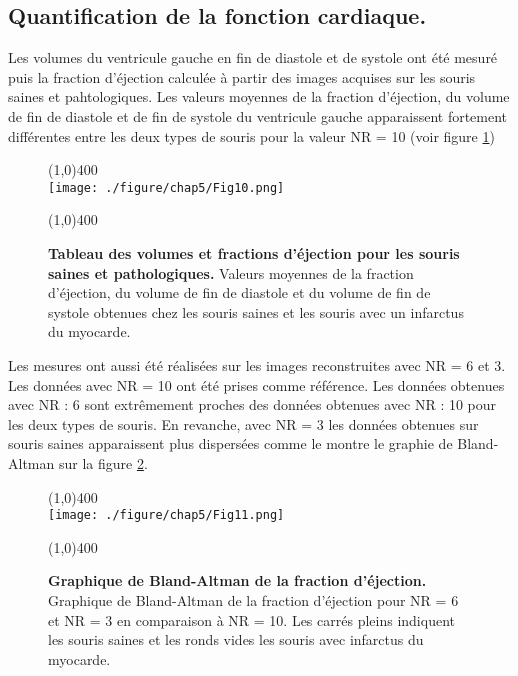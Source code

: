 \subsection{Quantification de la fonction cardiaque.}

Les volumes du ventricule gauche en fin de diastole et de systole ont été mesuré puis la fraction d'éjection calculée à partir des images acquises sur les souris saines et pahtologiques. Les valeurs moyennes de la fraction d'éjection, du volume de fin de diastole et de fin de systole du ventricule gauche apparaissent fortement différentes entre les deux types de souris pour la valeur NR = 10 (voir figure \ref{fig:TabFractionEjection})

\begin{figure}[H]
\centering
\line(1,0){400} \\
\texttt{[image: ./figure/chap5/Fig10.png]}
\caption[Tableau des volumes et fractions d'éjection pour les souris saines et pathologiques.]{\label{fig:TabFractionEjection} \textbf{Tableau des volumes et fractions d'éjection pour les souris saines et pathologiques.} Valeurs moyennes de la fraction d’éjection, du volume de fin de diastole et du volume de fin de systole obtenues chez les souris saines et les souris avec un infarctus du myocarde.}
\line(1,0){400} \\ 
\end{figure}

Les mesures ont aussi été réalisées sur les images reconstruites avec NR = 6 et 3. Les données avec NR = 10 ont été prises comme référence. Les données obtenues avec NR : 6 sont extrêmement proches des données obtenues avec NR : 10 pour les deux types de souris. En revanche, avec NR = 3 les données obtenues sur souris saines apparaissent plus dispersées comme le montre le graphie de Bland-Altman sur la figure \ref{fig:BlandAltmanFractionEjection}.

\begin{figure}[H]
\centering
\line(1,0){400} \\
\texttt{[image: ./figure/chap5/Fig11.png]}
\caption[Graphique de Bland-Altman de la fraction d’éjection.]{\label{fig:BlandAltmanFractionEjection} \textbf{Graphique de Bland-Altman de la fraction d’éjection.} Graphique de Bland-Altman de la fraction d’éjection pour NR = 6 et NR = 3 en comparaison à NR = 10. Les carrés pleins indiquent les souris saines et les ronds vides les souris avec infarctus du myocarde.}
\line(1,0){400} \\ 
\end{figure}

